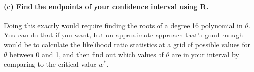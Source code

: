 \documentclass[]{article}
\let\oldparagraph\paragraph
\renewcommand{\paragraph}[1]{\oldparagraph{#1}\mbox{}}
\begin{document}
\paragraph{(c) Find the endpoints of your confidence interval using
R.}\label{c-find-the-endpoints-of-your-confidence-interval-using-r.}

Doing this exactly would require finding the roots of a degree 16
polynomial in \(\theta\). You can do that if you want, but an
approximate approach that's good enough would be to calculate the
likelihood ratio statistics at a grid of possible values for \(\theta\)
between 0 and 1, and then find out which values of \(\theta\) are in
your interval by comparing to the critical value \(w^*\).
\end{document}
